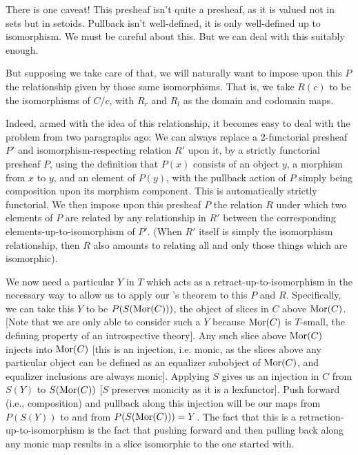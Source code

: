 There is one caveat! This presheaf isn't quite a presheaf, as it is valued not in sets but in setoids. Pullback isn't well-defined, it is only well-defined up to isomorphism. We must be careful about this. But we can deal with this suitably enough.

But supposing we take care of that, we will naturally want to impose upon this $P$ the relationship given by those same isomorphisms. That is, we take $R(c)$ to be the isomorphisms of $C/c$, with $R_r$ and $R_l$ as the domain and codomain maps.

Indeed, armed with the idea of this relationship, it becomes easy to deal with the problem from two paragraphs ago: We can always replace a 2-functorial presheaf $P'$ and isomorphism-respecting relation $R'$ upon it, by a strictly functorial presheaf $P$, using the definition that $P(x)$ consists of an object $y$, a morphism from $x$ to $y$, and an element of $P(y)$, with the pullback action of $P$ simply being composition upon its morphism component. This is automatically strictly functorial. We then impose upon this presheaf $P$ the relation $R$ under which two elements of $P$ are related by any relationship in $R'$ between the corresponding elements-up-to-isomorphism of $P'$. (When $R'$ itself is simply the isomorphism relationship, then $R$ also amounts to relating all and only those things which are isomorphic). 

We now need a particular $Y$ in $T$ which acts as a retract-up-to-isomorphism in the necessary way to allow us to apply our \Loeb's theorem to this $P$ and $R$. Specifically, we can take this $Y$ to be $P(S(\operatorname{Mor}(C)))$, the object of slices in $C$ above $\operatorname{Mor}(C)$. [Note that we are only able to consider such a $Y$ because $\operatorname{Mor}(C)$ is $T$-small, the defining property of an introspective theory]. Any such slice above $\operatorname{Mor}(C)$ injects into $\operatorname{Mor}(C)$ [this is an injection, i.e. monic, as the slices above any particular object can be defined as an equalizer subobject of $\operatorname{Mor}(C)$, and equalizer inclusions are always monic]. Applying $S$ gives us an injection in $C$ from $S(Y)$ to $S(\operatorname{Mor}(C))$ [$S$ preserves monicity as it is a lexfunctor]. Push forward (i.e., composition) and pullback along this injection will be our maps from $P(S(Y))$ to and from $P(S(\operatorname{Mor}(C))) = Y$. The fact that this is a retraction-up-to-isomorphism is the fact that pushing forward and then pulling back along any monic map results in a slice isomorphic to the one started with. 

